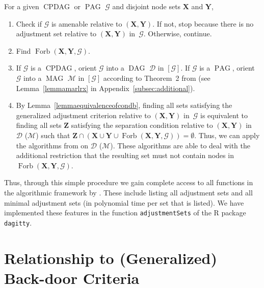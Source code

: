 \documentclass[11pt,a4paper]{article}
\DeclareMathOperator{\CPDAG}{CPDAG}
\DeclareMathOperator{\DAG}{DAG}
\DeclareMathOperator{\MAG}{MAG}
\DeclareMathOperator{\PAG}{PAG}
\DeclareMathOperator{\Forbi}{Forb}
\newcommand{\condtwoprime}{the separation condition\xspace}
\newcommand{\g}[1][G]{\mathcal{#1}}
\newcommand{\fb}[2][X,Y]{\Forbi(\mathbf{#1},#2)}%
\begin{document}
For a given $\CPDAG$ or $\PAG$ $\g$ and disjoint node sets $\mathbf{X}$ and $\mathbf{Y}$,

\begin{enumerate}[label=(\arabic*)]

\item Check if $\g$ is amenable relative to $(\mathbf{X},\mathbf{Y})$. If not, stop
because there is no adjustment set relative to $(\mathbf{X},\mathbf{Y})$ in~$\g$. Otherwise,
continue.

\item Find $\fb{\g}$.

\item If $\g$ is a $\CPDAG$, orient $\g$ into a $\DAG$ $\g[D]$ in $[\g]$. If $\g$ is a $\PAG$, orient $\g$ into a $\MAG$ $\g[M]$ in $[\g]$ according to Theorem~2 from \cite{zhang2008completeness} (see Lemma~\ref{lemmamarlrx} in Appendix~\ref{subsec:additional}).

\item By Lemma~\ref{lemmaequivalenceofcondb}, finding all sets satisfying the generalized adjustment criterion relative to $(\mathbf{X},\mathbf{Y})$ in~$\g$ is equivalent to finding all sets $\mathbf{Z}$ satisfying \condtwoprime relative to $(\mathbf{X},\mathbf{Y})$ in~$\g[D]$ ($\g[M]$) such that $\mathbf{Z} \cap (\mathbf{X} \cup \mathbf{Y} \cup \fb{\g}) = \emptyset$. Thus, we can apply the algorithms from \cite{vanconstructing} on $\g[D]$ ($\g[M]$). These algorithms are able to deal with the additional restriction that the resulting set must not contain nodes in $\fb{\g}$.

\end{enumerate}

Thus, through this simple procedure we gain complete access to all functions in the algorithmic framework by \cite{vanconstructing}. These include listing all adjustment sets and all minimal adjustment sets (in polynomial time per set that is listed). We have implemented these features in the function \texttt{adjustmentSets} of the R package \texttt{dagitty}.

\section{Relationship to (Generalized) Back-door Criteria} \label{sec:relation}
\end{document}
